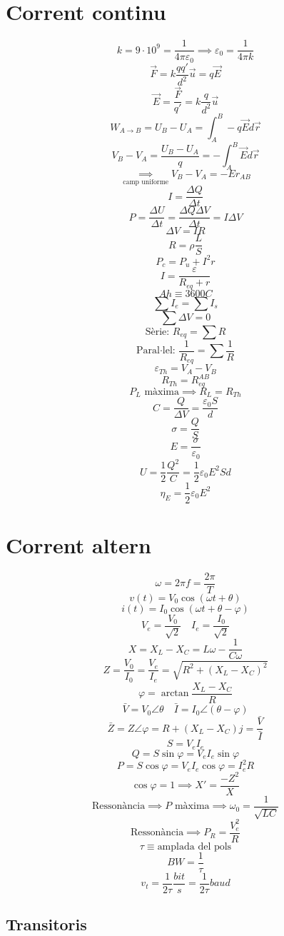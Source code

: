 \documentclass[10pt,twocolumn]{article}
\begin{document}
\section{Corrent continu}
\[ k = 9\cdot 10^9 = \frac{1}{4\pi \varepsilon_0} \implies \varepsilon_0 = \frac{1}{4\pi k} \]
\[ \vec F=k\frac{q q'}{d^2} \vec u = q \vec E \]
\[ \vec E=\frac{\vec F}{q'}=k\frac{q}{d^2} \vec u \]
\[ W_{A \to B} = U_B - U_A = \int_A^B -q \vec E d \vec r \]
\[ V_B - V_A=\frac{U_B - U_A}{q}=-\int_A^B \vec E d \vec r \]
\[ \underset{\text{camp uniforme}}{\implies} V_B - V_A = -Er_{AB} \]
\[ I = \frac{\Delta Q}{\Delta t} \]
\[ P = \frac{\Delta U}{\Delta t} = \frac{\Delta Q \Delta V}{\Delta t} = I\Delta V \]
\[ \Delta V = IR \]
\[ R = \rho \frac{L}{S} \]
\[ P_c = P_u + I^2 r \]
\[ I=\frac{\varepsilon}{R_{eq} + r} \]
\[ \si{Ah} \equiv 3600 \si{C} \]
\[ \sum I_e = \sum I_s \]
\[ \sum \Delta V = 0 \]
\[ \text{Sèrie: } R_{eq} = \sum R \]
\[ \text{Paral·lel: } \frac{1}{R_{eq}} = \sum \frac{1}{R} \]
\[ \varepsilon_{Th} = V_A - V_B \]
\[ R_{Th} = R_{eq}^{AB} \]
\[ P_L \text{ màxima} \implies R_L = R_{Th} \]
\[ C = \frac{Q}{\Delta V} = \frac{\varepsilon_0 S}{d} \]
\[ \sigma = \frac{Q}{S} \]
\[ E = \frac{\sigma}{\varepsilon_0} \]
\[ U=\frac{1}{2} \frac{Q^2}{C} = \frac{1}{2}\varepsilon_0 E^2 S d \]
\[ \eta_E = \frac{1}{2} \varepsilon_0 E^2 \]
\section{Corrent altern}
\[ \omega = 2\pi f = \frac{2\pi}{T} \]
\[ v\left(t\right)=V_0 \cos \left(\omega t + \theta \right) \]
\[ i\left(t\right)=I_0 \cos \left(\omega t + \theta - \varphi \right) \]
\[ V_e = \frac{V_0}{\sqrt 2} \quad I_e = \frac{I_0}{\sqrt 2} \]
\[ X = X_L - X_C = L\omega - \frac{1}{C\omega} \]
\[ Z = \frac{V_0}{I_0} = \frac{V_e}{I_e} = \sqrt{R^2 + (X_L - X_C)^2} \]
\[ \varphi = \arctan \frac{X_L - X_C}{R} \]
\[ \bar V = V_0 \angle \theta \quad \bar I = I_0 \angle \left(\theta - \varphi\right) \]
\[ \bar Z = Z\angle \varphi = R + (X_L-X_C)j = \frac{\bar V}{\bar I} \]
\[ S = V_e I_e \]
\[ Q = S \sin \varphi = V_e I_e \sin \varphi \]
\[ P = S \cos \varphi = V_e I_e \cos \varphi = I_e^2 R \]
\[ \cos \varphi = 1 \implies X' = \frac{-Z^2}{X} \]
\[ \text{Ressonància} \implies P \text{ màxima} \implies \omega_0 = \frac{1}{\sqrt{LC}} \]
\[ \text{Ressonància} \implies P_R = \frac{V_e^2}{R} \]
\[ \tau \equiv \text{amplada del pols} \]
\[ BW = \frac{1}{\tau} \]
\[ v_t = \frac{1}{2\tau}\si{\frac{bit}{s}} = \frac{1}{2\tau} \si{baud} \]
\subsection{Transitoris}
\end{document}
